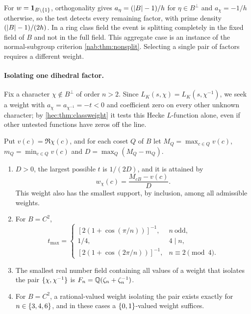 For $w=\mathbf{1}_{B\setminus\{1\}}$, orthogonality gives $a_\eta=(\lvert B\rvert-1)/h$ for $\eta\in B^\perp$ and
$a_\chi=-1/h$ otherwise, so the test detects every remaining factor, with prime density
$(\lvert B\rvert-1)/(2h)$. In a ring class field the event is splitting completely in the fixed field of $B$ and
not in the full field. This aggregate case is an instance of the normal-subgroup criterion
\cref{nab:thm:nonsplit}. Selecting a single pair of factors requires a different weight.

\paragraph{Isolating one dihedral factor.}
Fix a character $\chi\notin B^\perp$ of order $n>2$. Since $L_K(s,\chi)=L_K(s,\chi^{-1})$, we seek a
weight with $a_\chi=a_{\chi^{-1}}=-t<0$ and coefficient zero on every other unknown character; by
\cref{hec:thm:classweight} it tests this Hecke $L$-function alone, even if other untested functions have
zeros off the line.

\begin{theorem}\label{hec:thm:isolate}
Put $v(c)=\Re\chi(c)$, and for each coset $Q$ of $B$ let $M_Q=\max_{c\in Q}v(c)$,
$m_Q=\min_{c\in Q}v(c)$ and $D=\max_Q(M_Q-m_Q)$.
\begin{enumerate}[label=\textup{(\roman*)}]
\item $D>0$, the largest possible $t$ is $1/(2D)$, and it is attained by
\[
 w_\chi(c)=\frac{M_{cB}-v(c)}D .
\]
This weight also has the smallest support, by inclusion, among all admissible weights.
\item For $B=C^2$,
\[
 t_{\max}=\begin{cases}
 [2(1+\cos(\pi/n))]^{-1},&n\ \text{odd},\\
 1/4,&4\mid n,\\
 [2(1+\cos(2\pi/n))]^{-1},&n\equiv2\pmod4 .
 \end{cases}
\]
\item The smallest real number field containing all values of a weight that isolates the pair
$\{\chi,\chi^{-1}\}$ is $F_n=\mathbb{Q}(\zeta_n+\zeta_n^{-1})$.
\item For $B=C^2$, a rational-valued weight isolating the pair exists exactly for $n\in\{3,4,6\}$, and
in these cases a $\{0,1\}$-valued weight suffices.
\end{enumerate}
\end{theorem}

